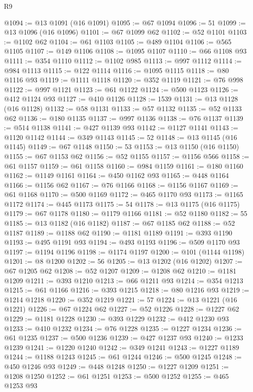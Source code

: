 \begin{lexlean}{R9}
\begin{coremodule}
@1094 := @13 @1091 (@16 @1091)
@1095 := @67 @1094
@1096 := 51
@1099 := @13 @1096 (@16 @1096)
@1101 := @67 @1099 @62
@1102 := @52 @1101
@1103 := @1102 @62
@1104 := @61 @1103
@1105 := @489 @1104
@1106 := @565 @1105
@1107 := @149 @1106
@1108 := @1095 @1107
@1110 := @66 @1108 @93
@1111 := @354 @1110
@1112 := @1102 @985
@1113 := @997 @1112
@1114 := @984 @1113
@1115 := @122 @1114
@1116 := @1095 @1115
@1118 := @80 @1116 @93
@1119 := @1111 @1118
@1120 := @352 @1119
@1121 := @76 @998
@1122 := @997 @1121
@1123 := @61 @1122
@1124 := @500 @1123
@1126 := @412 @1124 @93
@1127 := @410 @1126
@1128 := 1539
@1131 := @13 @1128 (@16 @1128)
@1132 := @58 @1131
@1133 := @57 @1132
@1135 := @52 @1133 @62
@1136 := @180 @1135
@1137 := @997 @1136
@1138 := @76 @1137
@1139 := @514 @1138
@1141 := @427 @1139 @93
@1142 := @1127 @1141
@1143 := @1120 @1142
@1144 := @349 @1143
@1145 := 52
@1148 := @13 @1145 (@16 @1145)
@1149 := @67 @1148
@1150 := 53
@1153 := @13 @1150 (@16 @1150)
@1155 := @67 @1153 @62
@1156 := @52 @1155
@1157 := @1156 @566
@1158 := @61 @1157
@1159 := @61 @1158
@1160 := @984 @1159
@1161 := @180 @1160
@1162 := @1149 @1161
@1164 := @450 @1162 @93
@1165 := @448 @1164
@1166 := @1156 @62
@1167 := @76 @1166
@1168 := @1156 @1167
@1169 := @61 @1168
@1170 := @500 @1169
@1172 := @465 @1170 @93
@1173 := @1165 @1172
@1174 := @445 @1173
@1175 := 54
@1178 := @13 @1175 (@16 @1175)
@1179 := @67 @1178
@1180 := @1179 @1166
@1181 := @52 @1180
@1182 := 55
@1185 := @13 @1182 (@16 @1182)
@1187 := @67 @1185 @62
@1188 := @52 @1187
@1189 := @1188 @62
@1190 := @1181 @1189
@1191 := @393 @1190
@1193 := @495 @1191 @93
@1194 := @493 @1193
@1196 := @509 @1170 @93
@1197 := @1194 @1196
@1198 := @1174 @1197
@1200 := @101 (@1144 @1198)
@1201 := @8 @1200
@1202 := 56
@1205 := @13 @1202 (@16 @1202)
@1207 := @67 @1205 @62
@1208 := @52 @1207
@1209 := @1208 @62
@1210 := @1181 @1209
@1211 := @393 @1210
@1213 := @66 @1211 @93
@1214 := @354 @1213
@1215 := @61 @1166
@1216 := @393 @1215
@1218 := @80 @1216 @93
@1219 := @1214 @1218
@1220 := @352 @1219
@1221 := 57
@1224 := @13 @1221 (@16 @1221)
@1226 := @67 @1224 @62
@1227 := @52 @1226
@1228 := @1227 @62
@1229 := @1181 @1228
@1230 := @393 @1229
@1232 := @412 @1230 @93
@1233 := @410 @1232
@1234 := @76 @1228
@1235 := @1227 @1234
@1236 := @61 @1235
@1237 := @500 @1236
@1239 := @427 @1237 @93
@1240 := @1233 @1239
@1241 := @1220 @1240
@1242 := @349 @1241
@1243 := @1227 @1189
@1244 := @1188 @1243
@1245 := @61 @1244
@1246 := @500 @1245
@1248 := @450 @1246 @93
@1249 := @448 @1248
@1250 := @1227 @1209
@1251 := @1208 @1250
@1252 := @61 @1251
@1253 := @500 @1252
@1255 := @465 @1253 @93

\end{coremodule}
\end{lexlean}
